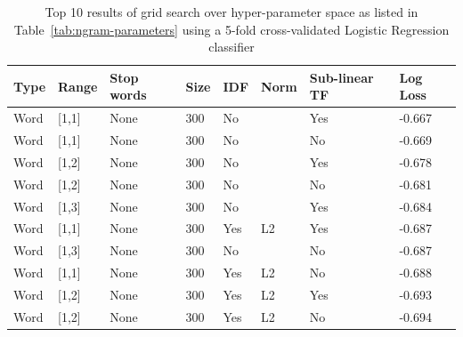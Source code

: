 \begin{center}
  \begin{table}[h]
  \begin{tabular}{ l l l l l l l l }
    \toprule
    Type & Range & Stop words & Size & IDF & Norm & Sub-linear TF & Log Loss \\
    \midrule
    Word & [1,1] & None & 300 & No & & Yes & -0.667 \\
    Word & [1,1] & None & 300 & No & & No & -0.669 \\
    Word & [1,2] & None & 300 & No & & Yes & -0.678 \\
    Word & [1,2] & None & 300 & No & & No & -0.681 \\
    Word & [1,3] & None & 300 & No & & Yes & -0.684 \\
    Word & [1,1] & None & 300 & Yes & L2 & Yes & -0.687 \\
    Word & [1,3] & None & 300 & No & & No & -0.687 \\
    Word & [1,1] & None & 300 & Yes & L2 & No & -0.688 \\
    Word & [1,2] & None & 300 & Yes & L2 & Yes & -0.693 \\
    Word & [1,2] & None & 300 & Yes & L2 & No & -0.694 \\
    \bottomrule
  \end{tabular}
  \caption{Top 10 results of grid search over hyper-parameter space as listed in Table~\ref{tab:ngram-parameters} using a 5-fold cross-validated Logistic Regression classifier}
\label{tab:ngram-grid-results-logreg}
  \end{table}
\end{center}

